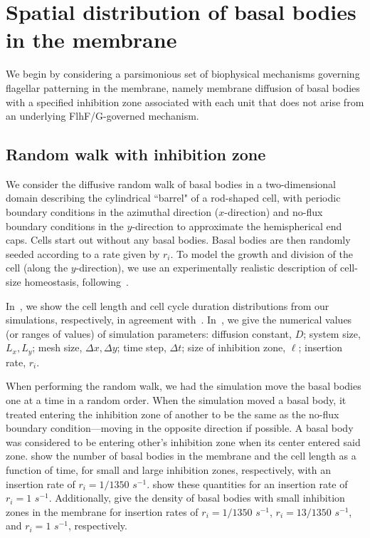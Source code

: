 \section{Spatial distribution of basal bodies in the membrane}

We begin by considering a parsimonious set of biophysical mechanisms governing flagellar patterning in the membrane, namely  membrane diffusion of basal bodies with a specified inhibition zone associated with each unit that does not arise from an underlying \mbox{FlhF/G-governed} mechanism.

\subsection{Random walk with inhibition zone}
We consider the diffusive random walk of basal bodies in a two-dimensional domain describing the cylindrical ``barrel" of a rod-shaped cell, with periodic boundary conditions in the azimuthal direction ($x$-direction) and no-flux boundary conditions in the $y$-direction to approximate the hemispherical end caps. Cells start out without any basal bodies. Basal bodies are then randomly seeded according to a rate given by $r_i$. To model the growth and division of the cell (along the $y$-direction), we use an experimentally realistic description of cell-size homeostasis, following~\cite{Osella2014}.  

In~, we show the cell length and cell cycle duration distributions from our simulations, respectively, in agreement with~\cite{Osella2014}.  In~, we give the numerical values (or ranges of values) of simulation parameters: diffusion constant, $D$; system size, $L_x, L_y$; mesh size, $\Delta x, \Delta y$; time step, $\Delta t$; size of inhibition zone, $\ell$; insertion rate, $r_i$.

When performing the random walk, we had the simulation move the basal bodies one at a time in a random order. When the simulation moved a basal body, it treated entering the inhibition zone of another to be the same as the no-flux boundary condition---moving in the opposite direction if possible. A basal body was considered to be entering other's inhibition zone when its center entered said zone. 
 show the number of basal bodies in the membrane and the cell length as a function of time, for small and large inhibition zones, respectively, with an insertion rate of $r_i = 1/1350$ $s^{-1}$.  show these quantities for an insertion rate of $r_i = 1$ $s^{-1}$. Additionally,  give the density of basal bodies with small inhibition zones in the membrane for insertion rates of $r_i = 1/1350$ $s^{-1}$, $r_i = 13/1350$ $s^{-1}$, and $r_i = 1$ $s^{-1}$, respectively.

